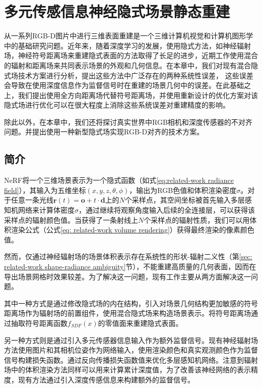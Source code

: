 \chapter{多元传感信息神经隐式场景静态重建}
\label{chapter: omninerf}
从一系列RGB-D图片中进行三维表面重建是一个三维计算机视觉和计算机图形学中的基础研究问题。近年来，随着深度学习的发展，使用隐式方法，如神经辐射场\cite{mildenhall_nerf_2020}，神经符号距离场\cite{wang_neus_2021}来重建隐式表面的方法取得了长足的进步，近期工作\cite{wang_neus_2021, azinovic_neural_2022}使用混合的辐射和距离场来共同表示场景的外观和几何信息。在本章中，我们对现有混合隐式场技术方案进行分析，提出这些方法中广泛存在的两种系统性误差， 这些误差会导致在使用深度信息作为监督信号时在重建的场景几何中的误差。在此基础之上，我们提出使用全方向距离场\cite{houchens_neuralodf_2022}代替符号距离场，并使用重新设计的优化方案对该隐式场进行优化可以在很大程度上消除这些系统误差对重建精度的影响。

除此以外，在本章中，我们还将探讨真实世界中RGB相机和深度传感器的不对齐问题。并提出使用一种新型隐式场实现RGB-D对齐的技术方案。

\section{简介}
NeRF\cite{mildenhall_nerf_2020}将一个三维场景表示为一个隐式函数（如式\ref{eq:related-work radiance field}），其输入为五维坐标$(x,y,z,\theta,\phi)$，输出为RGB色值和体积渲染密度$\sigma$。对于任意一条光线$\mathbf{r}(t) = \mathbf{o} + t\cdot\mathbf{d}$上的$N$个采样点，其空间坐标被首先输入多层感知机网络来计算体密度$\sigma$，通过继续将观察角度输入后续的全连接层，可以获得该采样点的辐射颜色值。当获得了一条射线上$N$个采样点的辐射性质，我们可以用体积渲染公式（公式\ref{eq: related-work volume rendering}）获得最终渲染的像素颜色值。

然而，仅通过神经辐射场的场景体积表示存在系统性的形状-辐射二义性\cite{zhang_nerf_2020}（第\ref{sec: related-work shape-radiance ambiguity}节），不能重建高质量的几何表面，因而在导出场景网格时效果较差。为了解决这一问题，现有工作主要从两方面解决这一问题。

其中一种方式是通过修改隐式场的内在结构，引入对场景几何结构更加敏感的符号距离场作为辐射场的前置组件，使用混合隐式场来构造场景表示。将符号距离场通过抽取符号距离函数$f_{SDF}(x)$的零值面来重建隐式表面。

另一种方式则是通过引入多元传感器信息输入作为额外监督信号。现有神经辐射场方法使用图片和其相机位姿作为网络输入，使用渲染颜色和真实观测颜色作为监督信号构建损失函数。通过反向传播损失函数值来优化多层感知机网络。注意到辐射场中的体积渲染方法同样可以用来计算累计深度值，为了改善该神经网络的表示精度，现有方法通过引入深度传感信息来构建额外的监督信号\cite{deng_depth-supervised_2022, roessle_dense_2022, azinovic_neural_2022}。


